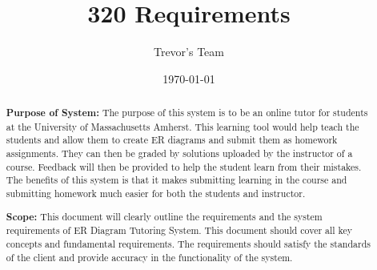 \documentclass{article}
\title{320 Requirements}
\author{Trevor's Team}
\date{\today}
\begin{document}
\begin{titlepage}

\maketitle

\begin{abstract}
\textbf{Purpose of System:} \newline
\newline
The purpose of this system is to be an online tutor for students at the University of Massachusetts Amherst. This learning tool would help teach the students and allow them to create ER diagrams and submit them as homework assignments. They can then be graded by solutions uploaded by the instructor of a course. Feedback will then be provided to help the student learn from their mistakes. The benefits of this system is that it makes submitting learning in the course and submitting homework much easier for both the students and instructor. \newline


\textbf{Scope:}
\newline \newline
This document will clearly outline the requirements and the system requirements of ER Diagram Tutoring System. This document should cover all key concepts and fundamental requirements. The requirements should satisfy the standards of the client and provide accuracy in the functionality of the system. 


\end{abstract}

\end{titlepage}
\end{document}
